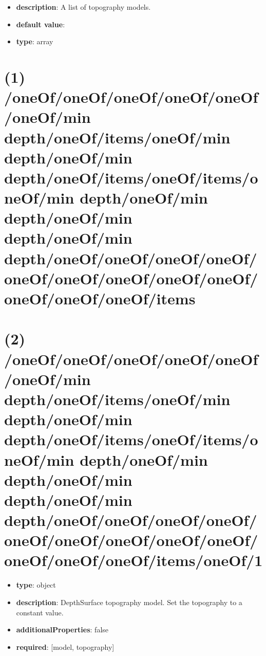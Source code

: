 \begin{itemize}[leftmargin=0em]\item {\bf description}: A list of topography models.
\item {\bf default value}: 
\item {\bf type}: array
\end{itemize}\section{(1) /oneOf/oneOf/oneOf/oneOf/oneOf/oneOf/min depth/oneOf/items/oneOf/min depth/oneOf/min depth/oneOf/items/oneOf/items/oneOf/min depth/oneOf/min depth/oneOf/min depth/oneOf/min depth/oneOf/oneOf/oneOf/oneOf/oneOf/oneOf/oneOf/oneOf/oneOf/oneOf/oneOf/oneOf/items}

\section{(2) /oneOf/oneOf/oneOf/oneOf/oneOf/oneOf/min depth/oneOf/items/oneOf/min depth/oneOf/min depth/oneOf/items/oneOf/items/oneOf/min depth/oneOf/min depth/oneOf/min depth/oneOf/min depth/oneOf/oneOf/oneOf/oneOf/oneOf/oneOf/oneOf/oneOf/oneOf/oneOf/oneOf/oneOf/items/oneOf/1}
\begin{itemize}[leftmargin=2em]\item {\bf type}: object
\item {\bf description}: DepthSurface topography model. Set the topography to a constant value.
\item {\bf additionalProperties}: false
\item {\bf required}: [model, topography]\end{itemize}
